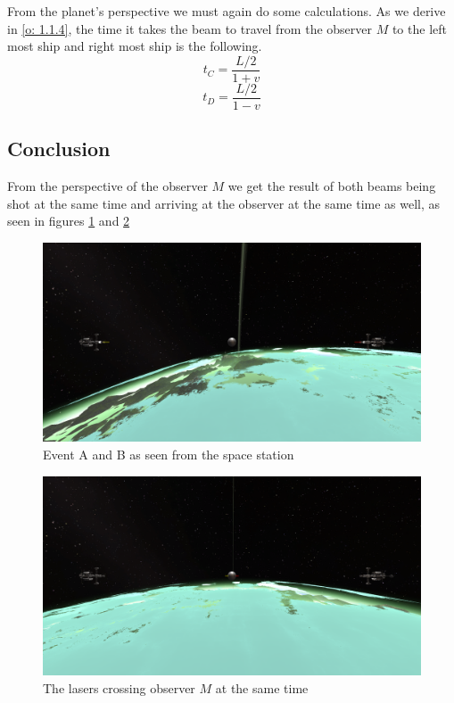 \documentclass[reprint,english,notitlepage]{revtex4-2}
\begin{document}
  
  From the planet's perspective we must again do some calculations. As we derive in \ref{o: 1.1.4}, the time it takes the beam to travel from the observer $ M $ to the left most ship and right most ship is the following.
  \begin{equation}\label{eq: t_C}
    t_C = \frac{L / 2}{1 + v}
  \end{equation}
  \begin{equation}\label{eq: t_D}
    t_D = \frac{L / 2}{1 - v}
  \end{equation}
  
  
  
  
  
  \subsection{Conclusion} 
  From the perspective of the observer $ M $ we get the result of both beams being shot at the same time and arriving at the observer at the same time as well, as seen in figures \ref{fig: A_B station} and \ref{fig: M_station}
  \begin{figure}[h!]
    \centering
    \includegraphics[scale = .1]{figures/A_B_Station.png}
    \caption{Event A and B as seen from the space station}
    \label{fig: A_B station}
  \end{figure} 
  
  \begin{figure}[h!]
    \centering
    \includegraphics[scale = .1]{figures/M_Station.png}
    \caption{The lasers crossing observer $ M $ at the same time}
    \label{fig: M_station}
  \end{figure}
  
\end{document}
